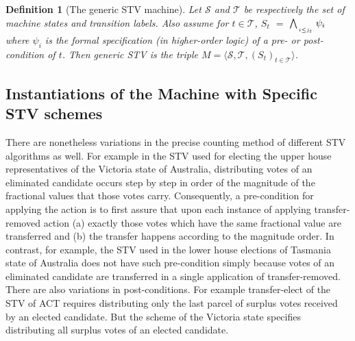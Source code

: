 \documentclass[10pt,conference]{IEEEtran}
\newtheorem{definition}{Definition}
\begin{document}
\begin{definition}[The generic STV machine]\label{STVMachine}
Let $\mathcal{S}$  and $\mathcal{T}$
be respectively the set of machine states and transition labels.  Also assume for $t\in\mathcal{T}$, $S_{t}$ $=$ $\bigwedge_{\atop{i\leq j_{t}}} \psi_{i}$ where  $\psi_{i}$ is the formal specification (in higher-order logic) of a pre- or post-condition of $t$. Then \emph{generic STV} is the triple $M = \langle \mathcal{S}, \mathcal{T}, (S_t)_{t \in \mathcal{T}} \rangle$. 
\end{definition}

\subsection{Instantiations of the Machine with Specific STV schemes}

There are nonetheless variations in the precise counting method of different STV algorithms as well. For example in the STV used for electing the upper house representatives of the Victoria state of Australia, distributing votes of an eliminated candidate occurs step by step in order of the magnitude of the fractional values that those votes carry.  Consequently, a pre-condition for applying the action is to first assure that upon each instance of applying transfer-removed action (a) exactly those votes which have the same fractional value are transferred and (b) the transfer happens according to the magnitude order. In contrast, for example, the STV used in the lower house elections of Tasmania state of Australia does not have such pre-condition simply because votes of an eliminated candidate are transferred in a single application of transfer-removed. There are also variations in post-conditions. For example transfer-elect of the STV of ACT requires distributing only the last parcel of surplus votes received by an elected candidate. But the scheme of the Victoria state specifies distributing all surplus votes of an elected candidate.  
\end{document}
